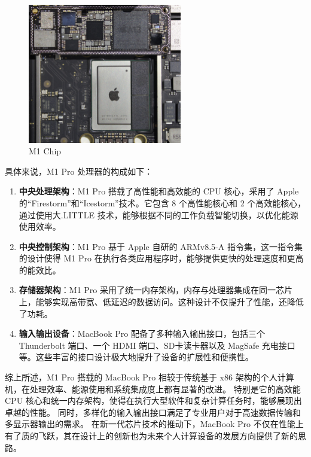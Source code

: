 \documentclass[12pt]{article} %
\theoremstyle{definition}
\begin{document}
\begin{figure}[h]
  \centering
  \includegraphics[width=0.6\textwidth]{./figs/M1_A13_comparison_MacMini9_1_M1.jpg}
  \caption{M1 Chip\cite{Sonic84002020Image}}
  \label{fig:AppleM1}
\end{figure}

具体来说，M1 Pro 处理器\cite{AppleM12023}的构成如下：

\begin{enumerate}
  \item \textbf{中央处理架构}：M1 Pro 搭载了高性能和高效能的 CPU 核心，采用了 Apple 的“Firestorm”和“Icestorm”技术。它包含 8 个高性能核心和 2 个高效能核心\cite{GSMArenaAppleM1}，通过使用大.LITTLE 技术，能够根据不同的工作负载智能切换，以优化能源使用效率。
  \item \textbf{中央控制架构}：M1 Pro 基于 Apple 自研的 ARMv8.5-A 指令集，这一指令集的设计使得 M1 Pro 在执行各类应用程序时，能够提供更快的处理速度和更高的能效比。
  \item \textbf{存储器架构}：M1 Pro 采用了统一内存架构，内存与处理器集成在同一芯片上，能够实现高带宽、低延迟的数据访问。这种设计不仅提升了性能，还降低了功耗。
  \item \textbf{输入输出设备}：MacBook Pro 配备了多种输入输出接口，包括三个 Thunderbolt 端口、一个 HDMI 端口、SD卡读卡器以及 MagSafe 充电接口等。这些丰富的接口设计极大地提升了设备的扩展性和便携性。
\end{enumerate}

综上所述，M1 Pro 搭载的 MacBook Pro 相较于传统基于 x86 架构的个人计算机，在处理效率、能源使用和系统集成度上都有显著的改进。
特别是它的高效能 CPU 核心和统一内存架构，使得在执行大型软件和复杂计算任务时，能够展现出卓越的性能。
同时，多样化的输入输出接口满足了专业用户对于高速数据传输和多显示器输出的需求。
在新一代芯片技术的推动下，MacBook Pro 不仅在性能上有了质的飞跃，其在设计上的创新也为未来个人计算设备的发展方向提供了新的思路。
\end{document}
